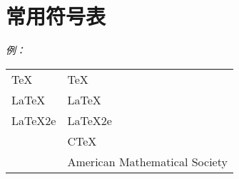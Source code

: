 \chapter{常用符号表}
\emph{例：}\par
\begin{center}
	\begin{tabular}{p{7em}p{20em}}
		\TeX     & TeX                           \\
		\LaTeX   & LaTeX                         \\
		\LaTeX2e & LaTeX2e                       \\
		\CTeX    & CTeX                          \\
		\AmS     & American Mathematical Society \\
	\end{tabular}
\end{center}
